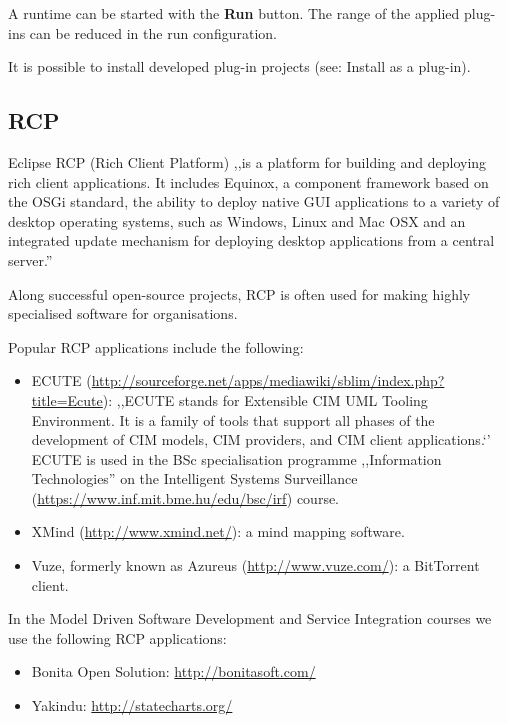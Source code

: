 \documentclass[]{report}
\begin{document}
A runtime can be started with the \textbf{Run} button. The range of the
applied plug-ins can be reduced in the run configuration.

It is possible to install developed plug-in projects (see: Install as a
plug-in).

\subsection{RCP}

Eclipse RCP (Rich Client Platform) ,,is a platform for building and
deploying rich client applications. It includes Equinox, a component
framework based on the OSGi standard, the ability to deploy native GUI
applications to a variety of desktop operating systems, such as Windows,
Linux and Mac OSX and an integrated update mechanism for deploying
desktop applications from a central server.''

Along successful open-source projects, RCP is often used for making
highly specialised software for organisations.

Popular RCP applications include the following:

\begin{itemize}
\itemsep1pt\parskip0pt
\item
  ECUTE
  (\url{http://sourceforge.net/apps/mediawiki/sblim/index.php?title=Ecute}):
  ,,ECUTE stands for Extensible CIM UML Tooling Environment. It is a
  family of tools that support all phases of the development of CIM
  models, CIM providers, and CIM client applications.`' ECUTE is used in
  the BSc specialisation programme ,,Information Technologies'' on the
  Intelligent Systems Surveillance
  (\url{https://www.inf.mit.bme.hu/edu/bsc/irf}) course.
\item
  XMind (\url{http://www.xmind.net/}): a mind mapping software.
\item
  Vuze, formerly known as Azureus (\url{http://www.vuze.com/}): a
  BitTorrent client.
\end{itemize}

In the Model Driven Software Development and Service Integration courses
we use the following RCP applications:

\begin{itemize}
\itemsep1pt\parskip0pt
\item
  Bonita Open Solution: \url{http://bonitasoft.com/}
\item
  Yakindu: \url{http://statecharts.org/}
\end{itemize}
\end{document}
